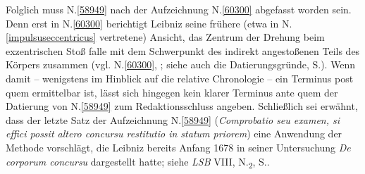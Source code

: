 \begin{ledgroup}
Folglich muss N.\;\ref{58949} nach der %
Aufzeichnung N.\;\ref{60300} abgefasst worden sein.
Denn erst in N.\;\ref{60300} berichtigt Leibniz seine frühere (etwa in N.\;\ref{impulsuseccentricus} %
vertretene) Ansicht, das Zentrum der Drehung beim exzentrischen Stoß falle mit dem Schwerpunkt des indirekt angestoßenen Teils des Körpers zusammen (vgl. N.\;\ref{60300}, ; siehe auch die Datierungsgründe, S.\;\pageref{LH_37_05_044_datierung}).
Wenn damit -- wenigstens im Hinblick auf die relative Chronologie -- ein Terminus post quem ermittelbar ist, lässt sich hingegen kein klarer Terminus ante quem der Datierung von N.\;\ref{58949} zum Redaktionsschluss angeben.%
\pend%
\pstart%
Schließlich sei erwähnt, dass der letzte Satz der Aufzeichnung N.\;\ref{58949} (\textit{Comprobatio seu examen, si effici possit altero concursu restitutio in statum priorem}) eine Anwendung der Methode vorschlägt, die Leibniz bereits Anfang 1678 in seiner Untersuchung \textit{De corporum concursu} dargestellt hatte;
siehe \textit{LSB} VIII, N.\textsubscript{2}, S..\cite{01401}
\pend%
\end{ledgroup}%
%
\frenchspacing%
\normalsize%
